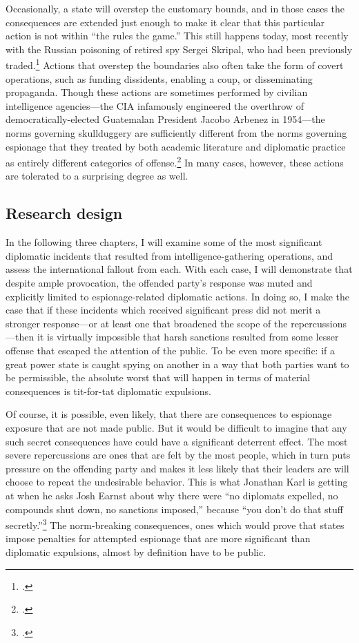 \documentclass{memoir}
\begin{document}
\begin{refsegment}
Occasionally, a state will overstep the customary bounds, and in those cases the consequences are extended just enough to make it clear that this particular action is not within ``the rules the game.'' This still happens today, most recently with the Russian poisoning of retired spy Sergei Skripal, who had been previously traded.\footcite{masters_has_2018} Actions that overstep the boundaries also often take the form of covert operations, such as funding dissidents, enabling a coup, or disseminating propaganda. Though these actions are sometimes performed by civilian intelligence agencies---the CIA infamously engineered the overthrow of democratically-elected Guatemalan President Jacobo Arbenez in 1954---the norms governing skullduggery are sufficiently different from the norms governing espionage that they treated by both academic literature and diplomatic practice as entirely different categories of offense.\footcite{fraser_architecture_2005} In many cases, however, these actions are tolerated to a surprising degree as well.

\subsection{Research design}
In the following three chapters, I will examine some of the most significant diplomatic incidents that resulted from intelligence-gathering operations, and assess the international fallout from each. With each case, I will demonstrate that despite ample provocation, the offended party's response was muted and explicitly limited to espionage-related diplomatic actions. In doing so, I make the case that if these incidents which received significant press did not merit a stronger response---or at least one that broadened the scope of the repercussions---then it is virtually impossible that harsh sanctions resulted from some lesser offense that escaped the attention of the public. To be even more specific: if a great power state is caught spying on another in a way that both parties want to be permissible, the absolute worst that will happen in terms of material consequences is tit-for-tat diplomatic expulsions.

Of course, it is possible, even likely, that there are consequences to espionage exposure that are not made public. But it would be difficult to imagine that any such secret consequences have could have a significant deterrent effect.  The most severe repercussions are ones that are felt by the most people, which in turn puts pressure on the offending party and makes it less likely that their leaders are will choose to repeat the undesirable behavior. This is what Jonathan Karl is getting at when he asks Josh Earnst about why there were ``no diplomats expelled, no compounds shut down, no sanctions imposed,'' because ``you don't do that stuff secretly.''\footcite{earnest_press_2017} The norm-breaking consequences, ones which would prove that states impose penalties for attempted espionage that are more significant than diplomatic expulsions, almost by definition have to be public.


\end{refsegment}
\end{document}
